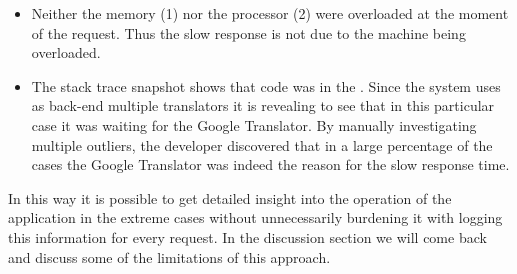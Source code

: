\begin{itemize}

  \item Neither the memory (1) nor the processor (2) were overloaded at the moment of the request. Thus the slow response is not due to the machine being overloaded.

  \item The stack trace snapshot shows that code was in the . Since the system uses as back-end multiple translators it is revealing to see that in this particular case it was waiting for the Google Translator. By manually investigating multiple outliers, the developer discovered that in a large percentage of the cases the Google Translator was indeed the reason for the slow response time.

\end{itemize}

  \niceseparator

  In this way it is possible to get detailed insight into the operation of the application in the extreme cases without unnecessarily burdening it with logging this information for every request. In the discussion section we will come back and discuss some of the limitations of this approach.




